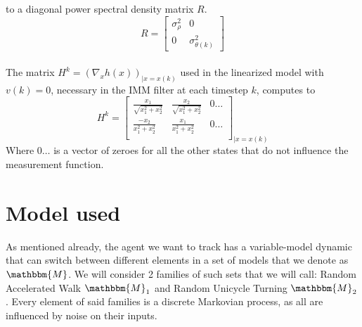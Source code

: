 \documentclass[twocolumn]{article}
\begin{document}
to a diagonal power spectral density matrix $R$.
\begin{equation*}
    R=\begin{bmatrix}
        \sigma^{2}_{\rho} & 0                       \\
        0                 & \sigma^{2}_{\theta (k)}
    \end{bmatrix}
\end{equation*}
\\
The matrix $H^{k}=(\nabla_{x} h(x))_{|x=x(k)}$ used in the linearized model with $v(k)=0$, necessary in the IMM filter at each timestep $k$,
computes to
\begin{equation*}
    H^{k}= \begin{bmatrix}
        \frac{x_{1}}{\sqrt{x_{1}^{2}+x_{2}^{2}}} & \frac{x_{2}}{\sqrt{x_{1}^{2}+x_{2}^{2}}} & 0 \dots \\
        \frac{-x_{2}}{x_{1}^{2}+x_{2}^{2}}       & \frac{x_{1}}{x_{1}^{2}+x_{2}^{2}}        & 0 \dots \\
    \end{bmatrix}_{|x=x(k)}
\end{equation*}
Where $0\dots$ is a vector of zeroes for all the other states that do not influence the measurement function.

\section*{Model used}
As mentioned already, the agent we want to track has a variable-model dynamic that can switch between different elements in a set
of models that we denote as $\mathbbm{M}$. We will consider 2 families of such sets that we will call: Random Accelerated Walk $\mathbbm{M}_{1}$
and Random Unicycle Turning $\mathbbm{M}_{2}$. Every element of said families is a discrete Markovian process, as all are influenced by
noise on their inputs.
\end{document}
